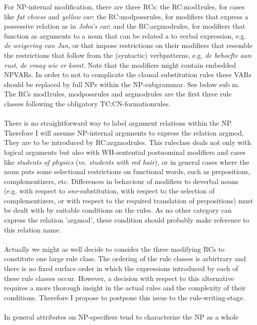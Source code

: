 For NP-internal modification, there are three RCs: the RC:mod1rules, for cases
like {\em fat cheese} 
and {\em yellow car}; the RC:modpossrules, for modifiers that
express a possessive relation as in {\em John's car}; and the RC:argmodrules,
for modifiers that function as arguments to a noun that can be related a to
verbal expression, e.g. {\em de weigering van Jan}, or that impose restrictions
on their modifiers that resemble the restrictions that follow from the
(syntactic) verbpatterns, e.g. {\em de behoefte aan rust}, {\em de vraag wie er
komt}. Note that the modifiers might contain embedded NPVARs. In order to
not to complicate the clausal substitution rules these VARs should be replaced 
by full NPs within the NP-subgrammar. See below sub m.
The RCs mod1rules, modpossrules and argmodrules 
are the first three rule classes following the
obligatory TC:CN-formationrules.\\ \\
There is no straightforward way to label argument relations within the NP.
Therefore I will assume NP-internal arguments to express the relation argmod,
They are to be introduced by RC:argmodrules. This ruleclass deals not only with
logical arguments but also with WH-sentential postnominal modifiers and cases
like {\em students of physics} (vs. {\em students with red hair}), or in
general cases where the noun puts some selectional restrictions on functional
words, such as prepositions, complementizers, etc. Differences in behaviour of
modifiers to deverbal nouns (e.g. with respect to {\em one}-substitution, with
respect to the selection of complementizers, or with respect to the required
translation of prepositions) must be dealt with 
by suitable conditions on the rules.
As no other category can express the relation 'argmod', these condition
should probably make reference to this relation name.\\ \\ 
Actually we might as well decide to consider the three modifying RCs to
constitute one large rule class. The ordering of the rule classes is arbirtrary
and there is no fixed surface order in which the expressions introduced by each
of these rule classes occur. However, a decision with respect to this
alternative requires a more thorough insight in the actual rules and the
complexity of their conditions. Therefore I propose to postpone this issue to
the rule-writing-stage.\\ \\ 
In general attributes on NP-specifiers tend to characterize the NP as a whole
